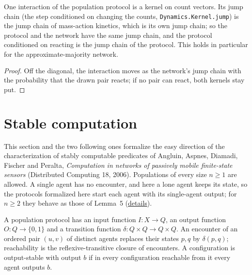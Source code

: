 \begin{theorem}\label{thm:crn1-jump}
\leanok{}
One interaction of the population protocol is a kernel on count vectors. Its jump chain (the step
conditioned on changing the counts, \texttt{Dynamics.Kernel.jump}) is the jump chain of
mass-action kinetics, which is its own jump chain; so the protocol and the network have the same
jump chain, and the protocol conditioned on reacting is the jump chain of the protocol. This holds
in particular for the approximate-majority network.
\end{theorem}
\begin{proof}\leanok
Off the diagonal, the interaction moves as the network's jump chain with the probability that the
drawn pair reacts; if no pair can react, both kernels stay put.
\end{proof}

\section{Stable computation}\label{sec:aadfp-stable}
This section and the two following ones formalize the easy direction of the characterization of
stably computable predicates of Angluin, Aspnes, Diamadi, Fischer and Peralta,
\emph{Computation in networks of passively mobile finite-state sensors} (Distributed Computing
18, 2006). Populations of every size $n\ge1$ are allowed. A single agent has no encounter, and
here a lone agent keeps its state, so the protocols formalized here start each agent with its
single-agent output; for $n\ge2$ they behave as those of Lemma~5
(\href{https://github.com/formal-dynamics/leanamics/blob/main/crn/FORMALIZATION_DIFFERENCES.md#semilinear-predicates-are-stably-computable-stable-crn-3-easy-direction}{details}).
\begin{definition}\label{def:protocol}
\leanok{}
A population protocol has an input function $I : X \to Q$, an output function $O : Q \to
\{0, 1\}$ and a transition function $\delta : Q \times Q \to Q \times Q$. An encounter of an
ordered pair $(u, v)$ of distinct agents replaces their states $p, q$ by $\delta(p, q)$;
reachability is the reflexive-transitive closure of encounters. A configuration is
output-stable with output $b$ if in every configuration reachable from it every agent outputs $b$.
\end{definition}

